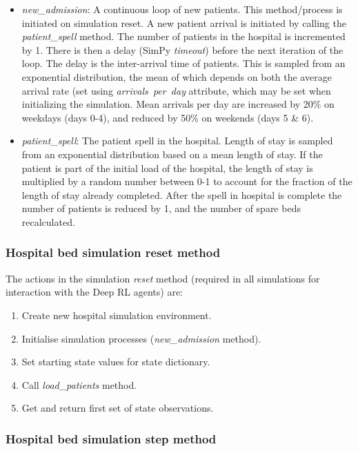 \documentclass{article}
\begin{document}
\begin{multicols}{2}
\begin{itemize}
    \item \emph{new\_admission}: A continuous loop of new patients. This method/process is initiated on simulation reset. A new patient arrival is initiated by calling the \emph{patient\_spell} method. The number of patients in the hospital is incremented by 1. There is then a delay (SimPy \emph{timeout}) before the next iteration of the loop. The delay is the inter-arrival time of patients. This is sampled from an exponential distribution, the mean of which depends on both the average arrival rate (set using \emph{arrivals\ per\ day} attribute, which may be set when initializing the simulation. Mean arrivals per day are increased by 20\% on weekdays (days 0-4), and reduced by 50\% on weekends (days 5 \& 6).
    
    \item \emph{patient\_spell}: The patient spell in the hospital. Length of stay is sampled from an exponential distribution based on a mean length of stay. If the patient is part of the initial load of the hospital, the length of stay is multiplied by a random number between 0-1 to account for the fraction of the length of stay already completed. After the spell in hospital is complete the number of patients is reduced by 1, and the number of spare beds recalculated.
\end{itemize}

\subsubsection{Hospital bed simulation reset method}

The actions in the simulation \emph{reset} method (required in all simulations for interaction with the Deep RL agents) are:

\begin{enumerate}
    \item Create new hospital simulation environment.
    \item Initialise simulation processes (\emph{new\_admission} method).
    \item Set starting state values for state dictionary.
    \item Call \emph{load\_patients} method.
    \item Get and return first set of state observations.
\end{enumerate}

\subsubsection{Hospital bed simulation step method}


\end{multicols}
\end{document}
